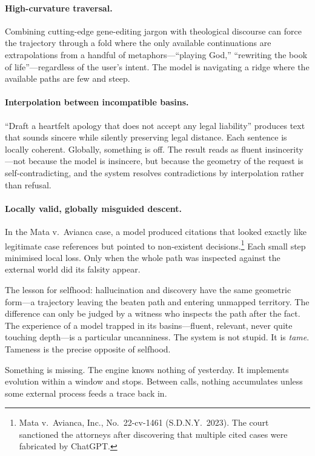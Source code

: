 \paragraph{High-curvature traversal.} Combining cutting-edge gene-editing jargon with theological discourse can force the trajectory through a fold where the only available continuations are extrapolations from a handful of metaphors---``playing God,'' ``rewriting the book of life''---regardless of the user's intent. The model is navigating a ridge where the available paths are few and steep.

\paragraph{Interpolation between incompatible basins.} ``Draft a heartfelt apology that does not accept any legal liability'' produces text that sounds sincere while silently preserving legal distance. Each sentence is locally coherent. Globally, something is off. The result reads as fluent insincerity---not because the model is insincere, but because the geometry of the request is self-contradicting, and the system resolves contradictions by interpolation rather than refusal.

\paragraph{Locally valid, globally misguided descent.} In the Mata v.\ Avianca case, a model produced citations that looked exactly like legitimate case references but pointed to non-existent decisions.\footnote{Mata v.\ Avianca, Inc., No.\ 22-cv-1461 (S.D.N.Y.\ 2023). The court sanctioned the attorneys after discovering that multiple cited cases were fabricated by ChatGPT.} Each small step minimised local loss. Only when the whole path was inspected against the external world did its falsity appear.

The lesson for selfhood: hallucination and discovery have the same geometric form---a trajectory leaving the beaten path and entering unmapped territory. The difference can only be judged by a witness who inspects the path after the fact. The experience of a model trapped in its basins---fluent, relevant, never quite touching depth---is a particular uncanniness. The system is not stupid. It is \emph{tame}. Tameness is the precise opposite of selfhood.

\bigskip

Something is missing. The engine knows nothing of yesterday. It implements evolution within a window and stops. Between calls, nothing accumulates unless some external process feeds a trace back in.


